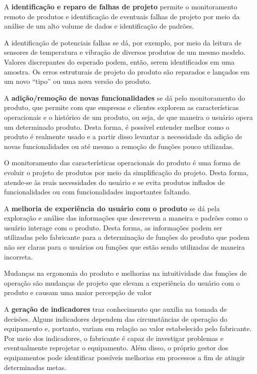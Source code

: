 A \textbf{identificação e reparo de falhas de projeto} permite o monitoramento remoto de produtos e identificação de eventuais falhas de projeto por meio da análise de um alto volume de dados e identificação de padrões.

A  identificação de potenciais falhas se dá, por exemplo, por meio da leitura de sensores de temperatura e vibração de diversos produtos de um mesmo modelo. Valores discrepantes do esperado podem, então, serem identificados em uma amostra. Os erros estruturais de projeto do produto são reparados e lançados em um novo ``tipo'' ou uma nova versão do produto.

A \textbf{adição/remoção de novas funcionalidades} se dá pelo monitoramento do produto, que permite com que empresas e clientes explorem  as características operacionais e o histórico de um produto, ou seja, de que maneira o usuário opera um determinado produto. Desta forma, é possível entender melhor como o produto é realmente usado e a partir disso levantar a necessidade da adição de novas funcionalidades ou até mesmo a remoção de funções pouco utilizadas.

O monitoramento das características operacionais do produto é uma forma de evoluir o projeto de produtos por meio da simplificação do projeto. Desta forma, atende-se às reais necessidades do usuário e se evita produtos inflados de funcionalidades ou com funcionalidades importantes faltando.

A \textbf{melhoria de experiência do usuário com o produto} se dá pela exploração e análise das informações que descrevem a maneira e padrões como o usuário interage com o produto. Desta forma, as informações podem ser utilizadas pelo fabricante para a determinação de funções do produto que podem não ser claras para o usuários ou funções que estão sendo utilizadas de maneira incorreta.

Mudanças na ergonomia do produto e melhorias na intuitividade das funções de operação são mudanças de projeto que elevam a experiência do usuário com o produto e causam uma maior percepção de valor

A \textbf{geração de indicadores} traz conhecimento que auxilia na tomada de decisões. Alguns indicadores dependem das circunstâncias de operação do equipamento e, portanto, variam em relação ao valor estabelecido pelo fabricante. Por meio dos indicadores, o fabricante é capaz de investigar problemas e eventualmente reprojetar o equipamento. Além disso, o próprio gestor dos equipamentos pode identificar possíveis melhorias em processos a fim de atingir determinadas metas.

